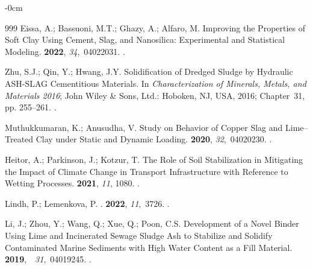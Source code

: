 \documentclass[sustainability,article,accept,pdftex,moreauthors]{Definitions/mdpi}
\begin{document}
{{\begin{adjustwidth}{-\extralength}{0cm}
\begin{thebibliography}{999}
Eissa, A.; Bassuoni, M.T.; Ghazy, A.; Alfaro, M.
\newblock Improving the Properties of Soft Clay Using Cement, Slag, and
  Nanosilica: Experimental and Statistical Modeling.
 {\bf 2022}, {\em
  34},~04022031.
.

Zhu, S.J.; Qin, Y.; Hwang, J.Y. Solidification of Dredged Sludge by Hydraulic
  ASH-SLAG Cementitious Materials.\linebreak 
\newblock In {\em Characterization of Minerals, Metals, and Materials 2016};
  John Wiley \& Sons, Ltd.:  Hoboken, NJ, USA, 2016; Chapter~31, pp. 255--261.
.

Muthukkumaran, K.; Anusudha, V.
\newblock Study on Behavior of Copper Slag and Lime–Treated Clay under Static
  and Dynamic Loading.
 {\bf 2020}, {\em
  32},~04020230.
.

Heitor, A.; Parkinson, J.; Kotzur, T.
\newblock The Role of Soil Stabilization in Mitigating the Impact of Climate
  Change in Transport Infrastructure with Reference to Wetting Processes.
 {\bf 2021}, {\em 11}, {1080.} %
.

Lindh, P.; Lemenkova, P.
.
 {\bf 2022}, {\em 11},~3726.
.

Li, J.; Zhou, Y.; Wang, Q.; Xue, Q.; Poon, C.S.
\newblock Development of a Novel Binder Using Lime and Incinerated Sewage
  Sludge Ash to Stabilize and Solidify Contaminated Marine Sediments with High
  Water Content as a Fill Material.
 \mbox{{\bf 2019}, {\em
  31},~04019245.}
.


\end{thebibliography}
\end{adjustwidth}}}
\end{document}
